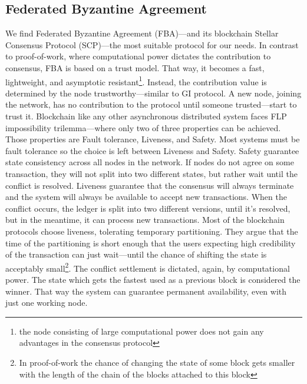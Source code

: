 \documentclass[nostrict]{szablonPG}
\begin{document}
\subsection{Federated Byzantine Agreement}
\label{FBA}
We find Federated Byzantine Agreement (FBA)––and its blockchain Stellar Consensus Protocol (SCP)\cite{mazieres2015stellar}––the most suitable protocol for our needs. In contrast to proof-of-work, where computational power dictates the contribution to consensus, FBA is based on a trust model. That way, it becomes a fast, lightweight, and asymptotic resistant\footnote{the node consisting of large computational power does not gain any advantages in the consensus protocol}. Instead, the contribution value is determined by the node trustworthy––similar to GI protocol. A new node, joining the network, has no contribution to the protocol until someone trusted––start to trust it.
Blockchain like any other asynchronous distributed system faces FLP\cite{fischer1985impossibility} impossibility trilemma––where only two of three properties can be achieved. Those properties are Fault tolerance, Liveness, and Safety. Most systems must be fault tolerance so the choice is left between Liveness and Safety. Safety guarantee state consistency across all nodes in the network. If nodes do not agree on some transaction, they will not split into two different states, but rather wait until the conflict is resolved. Liveness guarantee that the consensus will always terminate and the system will always be available to accept new transactions. When the conflict occurs, the ledger is split into two different versions, until it's resolved, but in the meantime, it can process new transactions. Most of the blockchain protocols choose liveness, tolerating temporary partitioning. They argue that the time of the partitioning is short enough that the users expecting high credibility of the transaction can just wait---until the chance of shifting the state is acceptably small\footnote{In proof-of-work the chance of changing the state of some block gets smaller with the length of the chain of the blocks attached to this block}. The conflict settlement is dictated, again, by computational power. The state which gets the fastest used as a previous block is considered the winner. That way the system can guarantee permanent availability, even with just one working node. 
\end{document}
